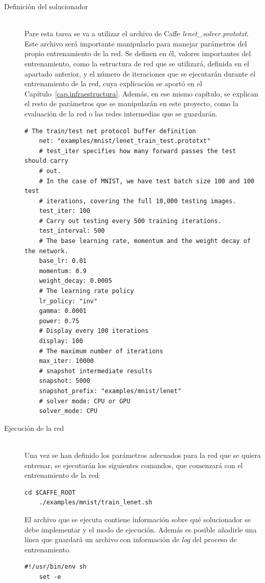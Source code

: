 \begin{description}
	\vspace{10pt}
	\item[Definición del solucionador] \hfill \\
	Pare esta tarea se va a utilizar el archivo de Caffe \textit{lenet\_solver.prototxt}.\\
	Este archivo será importante manipularlo para manejar parámetros del propio entrenamiento de la red. Se definen en él, valores importantes del entrenamiento, como la estructura de red que se utilizará, definida en el apartado anterior, y el número de iteraciones que se ejecutarán durante el entrenamiento de la red, cuya explicación se aportó en el Capítulo~\ref{cap.infraestructura}. Además, en ese mismo capítulo, se explican el resto de parámetros que se manipularán en este proyecto, como la evaluación de la red o las redes intermedias que se guardarán.
	\vspace{10pt}
	\begin{lstlisting}[frame=single]
	# The train/test net protocol buffer definition
	net: "examples/mnist/lenet_train_test.prototxt"
	# test_iter specifies how many forward passes the test should carry 
	# out.
	# In the case of MNIST, we have test batch size 100 and 100 test
	# iterations, covering the full 10,000 testing images.
	test_iter: 100
	# Carry out testing every 500 training iterations.
	test_interval: 500
	# The base learning rate, momentum and the weight decay of the network.
	base_lr: 0.01
	momentum: 0.9
	weight_decay: 0.0005
	# The learning rate policy
	lr_policy: "inv"
	gamma: 0.0001
	power: 0.75
	# Display every 100 iterations
	display: 100
	# The maximum number of iterations
	max_iter: 10000
	# snapshot intermediate results
	snapshot: 5000
	snapshot_prefix: "examples/mnist/lenet"
	# solver mode: CPU or GPU
	solver_mode: CPU	
	\end{lstlisting}
	\vspace{40pt}
	
	\item[Ejecución de la red] \hfill \\
	Una vez se han definido los parámetros adecuados para la red que se quiera entrenar, se ejecutarán los siguientes comandos, que comenzará con el entrenamiento de la red:
	\vspace{5pt}
	\begin{lstlisting}[frame=single]
	cd $CAFFE_ROOT
	./examples/mnist/train_lenet.sh	
	\end{lstlisting}
	
	El archivo que se ejecuta contiene información sobre qué solucionador se debe implementar y el modo de ejecución. Además es posible añadirle una línea que guardará un archivo con información de \textit{log} del proceso de entrenamiento.
	\vspace{5pt}
	\begin{lstlisting}[frame=single]
	#!/usr/bin/env sh
	set -e
	

\end{lstlisting}
\end{description}
